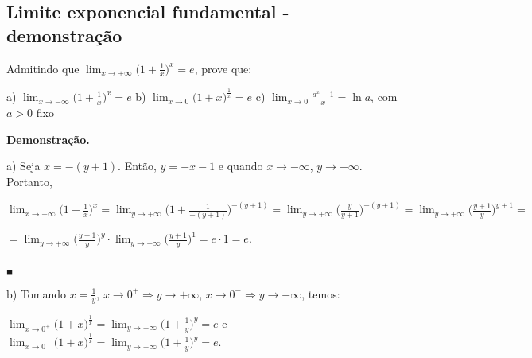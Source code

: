 \documentclass{article}
\begin{document}
{\begin{newpage}
\subsection{Limite exponencial fundamental - demonstração}
\par
\begin{flushleft} Admitindo que $\displaystyle{\lim_{x\to +\infty }} \Big(1 + \frac{1}{x}\Big)^x = e$, prove que:
\end{flushleft}
\par
\vspace{0.3cm}
a) $\displaystyle{\lim_{x\to -\infty }} \Big(1 + \frac{1}{x}\Big)^x = e$
\hspace{0.3cm}
b) $\displaystyle{\lim_{x\to 0}} \Big(1 + x\Big)^{\frac{1}{x}} = e$
\hspace{0.3cm}
c) $\displaystyle{\lim_{x\to 0}} \frac{a^x - 1}{x} = \ln{a}$, com $a>0$ fixo
\vspace{0.3cm}
\par
\textbf{Demonstração.}
\par
a) Seja $x=-(y+1)$. Então, $y=-x-1$ e quando $x\rightarrow -\infty $, $y\rightarrow +\infty $. Portanto,
\par
\vspace{0.3cm}
$ \displaystyle{\lim_{x\to -\infty }} \Big(1 + \frac{1}{x}\Big)^x = \displaystyle{\lim_{y\to +\infty }} \Big(1 + \frac{1}{-(y+1)}\Big)^{-(y+1)} = \displaystyle{\lim_{y\to +\infty }} \Big(\frac{y}{y+1}\Big)^{-(y+1)} = \displaystyle{\lim_{y\to +\infty }} \Big(\frac{y+1}{y}\Big)^{y+1} = $\par \vspace{0.2cm}$= \displaystyle{\lim_{y\to +\infty }} \Big(\frac{y+1}{y}\Big)^{y}\cdot \displaystyle{\lim_{y\to +\infty }} \Big(\frac{y+1}{y}\Big)^{1} = e\cdot1 = e$. \begin{flushright} $_{\blacksquare }$ \end{flushright}
\par
\vspace{0.3cm}
b) Tomando $x=\displaystyle{\frac{1}{y}}$, $x\rightarrow 0^{+}\Rightarrow y\rightarrow +\infty$, $x\rightarrow 0^{-}\Rightarrow y\rightarrow -\infty$, temos:
\par
\vspace{0.3cm}
$\displaystyle{\lim_{x\to 0^{+}}} \Big(1 + x\Big)^{\frac{1}{x}} =  \displaystyle{\lim_{y\to +\infty }} \Big(1 + \frac{1}{y}\Big)^{y} = e$\hspace{0.3cm} e
\hspace{0.3cm}
$\displaystyle{\lim_{x\to 0^{-}}} \Big(1 + x\Big)^{\frac{1}{x}} = \displaystyle{\lim_{y\to -\infty }} \Big(1 + \frac{1}{y}\Big)^{y} = e$.

\end{newpage}}
\end{document}
